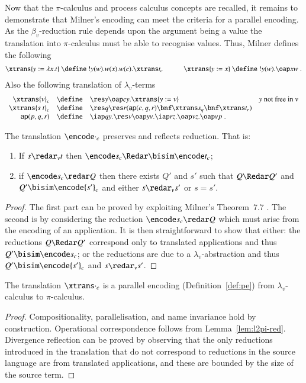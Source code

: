 \documentclass{llncs}
\begin{document}
Now that the $\pi$-calculus and process calculus concepts are recalled, it remains to
demonstrate that Milner's encoding \cite{90426} can meet the criteria for a parallel encoding.
As the $\beta_v$-reduction rule depends upon the argument being a value the translation into $\pi$-calculus must be able to recognise values. Thus, Milner defines the following
\begin{eqnarray*}
\xtrans {y:=\lambda x.t} \ \define\  !y(w).w(x).w(c).\xtrans t _c&\qquad&
\xtrans {y:=x} \ \define\ !y(w).\oap x w \; .
\end{eqnarray*}
Also the following translation of $\lambda_v$-terms
\begin{equation*}
\begin{array}{rcll}
\xtrans {v} _c &\define& \res y \oap c y .\xtrans {y:=v} & \mbox{$y$ not free in $v$}\\
\xtrans {s~t} _c &\define& \res q \res r ({\sf ap}(c,q,r) \bnf \xtrans s _q \bnf \xtrans t _r)\\
{\sf ap}(p,q,r) &\define& \iap q y .\res v \oap y v .\iap r z .\oap v z .\oap v p \; .
\end{array}
\end{equation*}

\begin{lemma}
\label{lem:l2pi-red}
The translation $\encode \cdot _c$ preserves and reflects reduction.
That is:
\begin{enumerate}
\item If $s\redar_v t$ then $\encode s _c \Redar\bisim \encode t _c$;
\item if $\encode s _c \redar Q$ then there exists $Q'$ and $s'$ such that
      $Q\Redar Q'$ and $Q'\bisim \encode {s'} _c$ and either $s\redar_v s'$ or $s=s'$.
\end{enumerate}
\end{lemma}
\begin{proof}
The first part can be proved by exploiting Milner's Theorem~7.7 \cite{90426}.
The second is by considering the reduction $\encode s _c\redar Q$ which must arise
from the encoding of an application. It is then straightforward to show that either:
the reductions $Q\Redar Q'$ correspond only to translated applications and thus
$Q'\bisim \encode s _c$; or
the reductions are due to a $\lambda_v$-abstraction and thus
$Q'\bisim\encode {s'}_c$ and $s\redar_v s'$.
\end{proof}

\begin{theorem}
\label{thm:lambda2pi}
The translation $\xtrans\cdot _c$ is a parallel encoding (Definition~\ref{def:pe}) from $\lambda_v$-calculus to $\pi$-calculus.
\end{theorem}
\begin{proof}
Compositionality, parallelisation, and name invariance hold by construction.
Operational correspondence follows from Lemma~\ref{lem:l2pi-red}.
Divergence reflection can be proved by observing that the only reductions introduced
in the translation that do not correspond to reductions in the source language are
from translated applications, and these are bounded by the size of the source term.
\end{proof}
\end{document}
